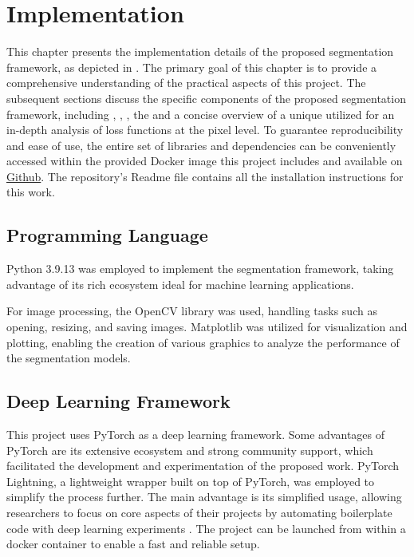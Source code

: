 \chapter{Implementation}
\label{chap:implementation}
This chapter presents the implementation details of the proposed segmentation framework, as depicted in . The primary goal of this chapter is to provide a comprehensive understanding of the practical aspects of this project. The subsequent sections discuss the specific components of the proposed segmentation framework, including , , , the  and a concise overview of a unique  utilized for an in-depth analysis of loss functions at the pixel level. To guarantee reproducibility and ease of use, the entire set of libraries and dependencies can be conveniently accessed within the provided Docker image this project includes and available on \href{https://github.com/MagicFeeling/framework-for-segmentation-loss-merging}{Github}. The repository's Readme file contains all the installation instructions for this work.

\section{Programming Language}
\label{sec:programming_language}
Python 3.9.13 was employed to implement the segmentation framework, taking advantage of its rich ecosystem ideal for machine learning applications.

For image processing, the OpenCV library \cite{bradski2000opencv} was used, handling tasks such as opening, resizing, and saving images. Matplotlib \cite{matplotlib2007} was utilized for visualization and plotting, enabling the creation of various graphics to analyze the performance of the segmentation models.

\section{Deep Learning Framework}
\label{sec:deep_learning_framework}
This project uses PyTorch as a deep learning framework. Some advantages of PyTorch are its extensive ecosystem and strong community support, which facilitated the development and experimentation of the proposed work. PyTorch Lightning, a lightweight wrapper built on top of PyTorch, was employed to simplify the process further. The main advantage is its simplified usage, allowing researchers to focus on core aspects of their projects by automating boilerplate code with deep learning experiments \cite{PytorchLightning}. The project can be launched from within a docker container to enable a fast and reliable setup.

